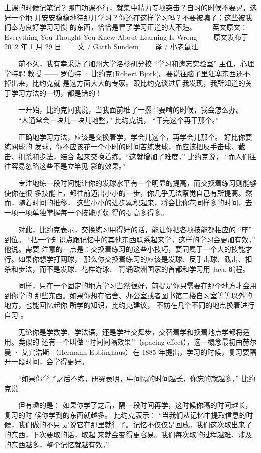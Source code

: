 \documentclass[11pt]{ctexart}
\begin{document}
{{{{上课的时候记笔记？哪门功课不行，就集中精力专项突击？自习的时候不要晃，选好一个地
儿安安稳稳地待那儿学习？你还在这样学习吗？不要被骗了：这些被我们奉为良好学习习惯
的东西，恰恰是冒了学习正道的大不韪。
　　英文原文：Everything You Thought You Knew About Learning Is Wrong
　　原文发布于 2012 年 1 月 29 日
　　文 / Garth Sundem
　　译 / 小老鼠汪

　　前不久，我有幸采访了加州大学洛杉矶分校 “学习和遗忘实验室” 主任，心理学特聘
教授 —— 罗伯特 · 比约克(Robert Bjork)。要说往脑子里狂塞东西还不掉出来，比约克就
是这方面大大的专家。跟比约克谈过后我发现，我所知道的关于学习方法的一切，都是错的！

　　一开始，比约克问我说，当我面前堆了一摞书要啃的时候，我会怎么办。
　　“人通常会一块儿一块儿地整，” 比约克说， “干完这个再干那个。”

　　正确地学习方法，应该是交换着学，学会儿这个，再学会儿那个。 好比你要练网球的
发球，你不应该花一个小时的时间苦练发球，而应该把反手击球、截击、扣杀和步法，结合
起来交换着练。“这就增加了难度，” 比约克说， “而人们往往容易忽略这些不是立竿见
影的效果。”

　　专注地练一段时间能让你的发球水平有一个明显的提高，而交换着练习则能够使你在很
多技能上，都往前迈出小小的一步，你几乎无法察觉自己有所提高。然而，随着时间的推移，
这些小小的进步累积起来，将会比你花同样多的时间，去一项一项单独掌握每一个技能所获
得的提高多得多。

　　对此，比约克表示，交换练习用得好的话，能让你把各项技能都相应的 “座” 到位。
“把一个知识点跟记忆中的其他东西联系起来学，这样的学习会更加有效，” 他说。需要
注意的一点是：交换着练习的这些小技巧，要同属于一个大的技能才行。如果你想学打网球，
那么你交换着练习的应该是发球、反手击球、截击、扣杀和步法，而不是发球、花样游泳、
背诵欧洲国家的首都和学习用 Java 编程。

　　同样，只在一个固定的地方学习当然很好，前提是你只需要在那个地方才会用到你学的
那些东西。如果你想在宿舍、办公室或者图书馆二楼自习室等等以外的地方，也能回忆起你
所学的知识，比约克建议， 不妨在几个不同的地点换着进行自习 。

　　无论你是学数学、学法语，还是学社交舞步，交替着学和换着地点学都将适用。类似的
还有一个叫做 “时间间隔效果”（spacing effect），这一概念最初由赫尔曼 · 艾宾浩斯
（Hermann Ebbinghaus）在 1885 年提出，学习的时候，复习要隔开一段时间，会学得更好。

　　“如果你学了之后不练，研究表明，中间隔的时间越长，你忘的就越多，” 比约克说

　　但有趣的是： 如果你学了之后，隔一段时间再学，这时候你隔的时间越长，复习的时
候你学到的东西就越多。 比约克表示： “当我们从记忆中提取信息的时候，我们做的不只
是说它在那里就行了。记忆不仅仅是回放。我们这次取出来了的东西，下次要取的话，取起
来就会变得更容易。我们每次取的过程越难、涉及的东西越多，整个记忆就越有效。”

}}}}
\end{document}
